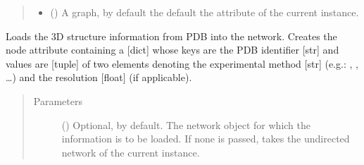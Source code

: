 \documentclass[letterpaper,10pt,english]{sphinxmanual}
\begin{document}
\begin{fulllineitems}
\begin{fulllineitems}
\begin{quote}
\begin{description}
\begin{itemize}
\item {} 
 () \textendash{} A graph, by default the default the  attribute of the
current instance.

\end{itemize}

\end{description}\end{quote}

\end{fulllineitems}


\begin{fulllineitems}
\label{\detokenize{reference:pypath.main.PyPath.load_pdb}}
Loads the 3D structure information from PDB into the network.
Creates the node attribute  containing a {[}dict{]} whose
keys are the PDB identifier {[}str{]} and values are {[}tuple{]} of two
elements denoting the experimental method {[}str{]} (e.g.:
, , …) and the resolution {[}float{]} (if
applicable).
\begin{quote}\begin{description}
\item[{Parameters}] \leavevmode
{} () \textendash{} Optional,  by default. The network object for which
the information is to be loaded. If none is passed, takes
the undirected network of the current instance.

\end{description}\end{quote}

\end{fulllineitems}


\begin{fulllineitems}
\label{\detokenize{reference:pypath.main.PyPath.load_pepcyber}}
\end{fulllineitems}


\end{fulllineitems}
\end{document}
